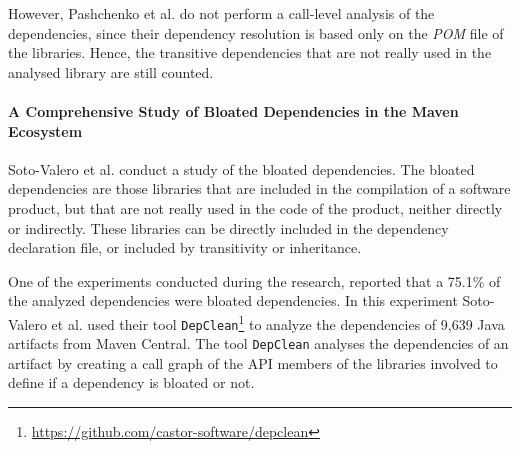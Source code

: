 However, Pashchenko et al. do not perform a call-level analysis of the dependencies, since their dependency resolution is based only on the \textit{POM} file of the libraries. Hence, the transitive dependencies that are not really used in the analysed library are still counted.

\paragraph{A Comprehensive Study of Bloated Dependencies in the Maven Ecosystem \cite{soto2020comprehensive}}
Soto-Valero et al. conduct a study of the bloated dependencies. The bloated dependencies are those libraries that are included in the compilation of a software product, but that are not really used in the code of the product, neither directly or indirectly. These libraries can be directly included in the dependency declaration file, or included by transitivity or inheritance.

One of the experiments conducted during the research, reported that a 75.1\% of the analyzed dependencies were bloated dependencies. In this experiment Soto-Valero et al. used their tool \texttt{DepClean}\footnote{\href{https://github.com/castor-software/depclean}{https://github.com/castor-software/depclean}} to analyze the dependencies of 9,639 Java artifacts from Maven Central.
The tool \texttt{DepClean} analyses the dependencies of an artifact by creating a call graph of the API members of the libraries involved to define if a dependency is bloated or not.




